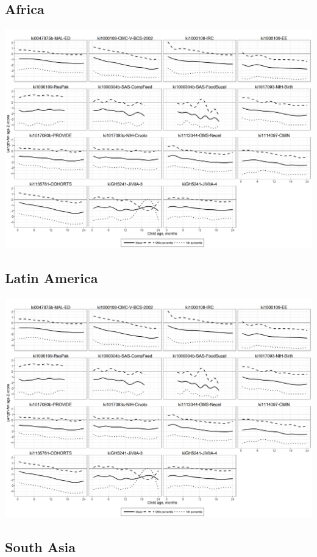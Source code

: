 \documentclass[9pt,]{book}
\begin{document}
\hypertarget{africa}{%
\subsection{Africa}\label{africa}}

\includegraphics[width=58.33in]{figure-copies/fig-laz-2-quant-cohort-africa-allage-primary}

\hypertarget{latin-america}{%
\subsection{Latin America}\label{latin-america}}

\includegraphics[width=58.33in]{figure-copies/fig-laz-2-quant-cohort-latamer-allage-primary}

\hypertarget{south-asia}{%
\subsection{South Asia}\label{south-asia}}
\end{document}
